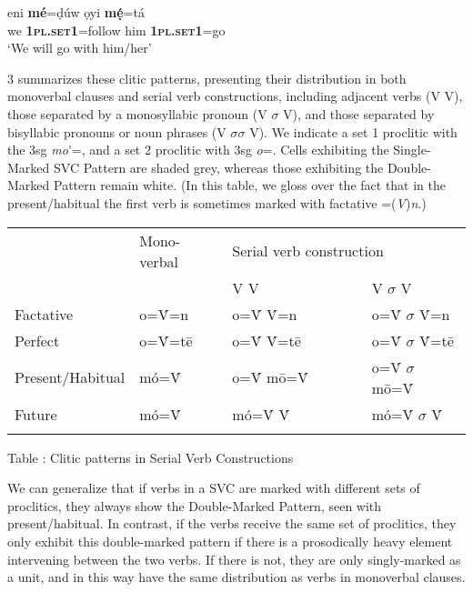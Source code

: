 \documentclass[output=paper]{langsci/langscibook}
\begin{document}
\ea
\gll   eni   \textbf{mé}=ḍúw     ọyi    \textbf{mẹ́}=tá\\ 
       we   \textbf{\textsc{1pl.set1}}=follow  him    \textbf{\textsc{1pl.set1}}=go\\
\glt ‘We will go with him/her’
\z

3 summarizes these clitic patterns, presenting their distribution in both monoverbal clauses and serial verb constructions, including adjacent verbs (V V), those separated by a monosyllabic pronoun (V $\sigma $ V), and those separated by bisyllabic pronouns or noun phrases (V $\sigma \sigma $ V). We indicate a set 1 proclitic with the 3sg \textit{mo}\'{ }=, and a set 2 proclitic with 3sg \textit{o}=. Cells exhibiting the Single-Marked SVC Pattern are shaded grey, whereas those exhibiting the Double-Marked Pattern remain white. (In this table, we gloss over the fact that in the present/habitual the first verb is sometimes marked with factative =(\textit{V})\textit{n}.)

\begin{table}

\begin{tabularx}{\textwidth}{XXXXX}
\lsptoprule
\hhline{----~} & {Mono-}{verbal} & \multicolumn{2}{X}{{Serial verb construction}} & \\
\hhline{--~~~} &  & {V V} & \multicolumn{2}{X}{{V $\sigma $ V}}\\
{Factative} & {o=\'{V}=n} & {o=\'{V} \'{V}=n} & \multicolumn{2}{X}{{o=\'{V} $\sigma $ \'{V}=n}}\\
{Perfect} & {o=\'{V}=t\={e}} & {o=\'{V} \'{V}=t\={e}} & \multicolumn{2}{X}{{o=\'{V} $\sigma $ \'{V}=t\={e}}}\\
{Present/Habitual} & {mó=\'{V}} & {o=\'{V} m\={o}=\'{V}} & \multicolumn{2}{X}{{o=\'{V} $\sigma $ m\={o}=\'{V}}}\\
{Future} & {mó=\'{V}} & {mó=\'{V} \'{V}} & \multicolumn{2}{X}{{mó=\'{V} $\sigma $ \'{V}}}\\
\lspbottomrule
\end{tabularx}
\label{bkm:Ref448125394}Table : Clitic patterns in Serial Verb Constructions
\end{table}



We can generalize that if verbs in a SVC are marked with different sets of proclitics, they always show the Double-Marked Pattern, seen with present/habitual. In contrast, if the verbs receive the same set of proclitics, they only exhibit this double-marked pattern if there is a prosodically heavy element intervening between the two verbs. If there is not, they are only singly-marked as a unit, and in this way have the same distribution as verbs in monoverbal clauses. 
\end{document}
